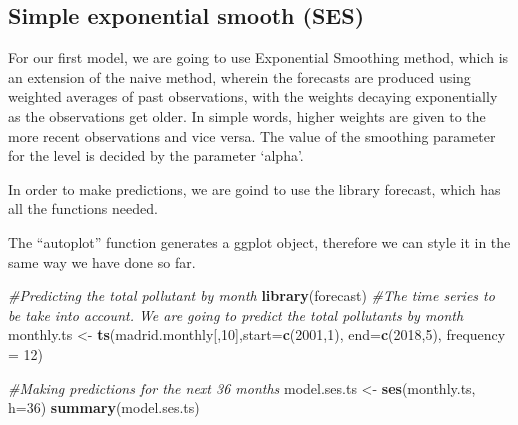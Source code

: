 \documentclass[
]{article}
\newenvironment{Shaded}{\begin{snugshade}}{\end{snugshade}}
\newcommand{\CommentTok}[1]{\textcolor[rgb]{0.56,0.35,0.01}{\textit{#1}}}
\newcommand{\DataTypeTok}[1]{\textcolor[rgb]{0.13,0.29,0.53}{#1}}
\newcommand{\DecValTok}[1]{\textcolor[rgb]{0.00,0.00,0.81}{#1}}
\newcommand{\KeywordTok}[1]{\textcolor[rgb]{0.13,0.29,0.53}{\textbf{#1}}}
\newcommand{\NormalTok}[1]{#1}
\newcommand{\StringTok}[1]{\textcolor[rgb]{0.31,0.60,0.02}{#1}}
\begin{document}
\hypertarget{simple-exponential-smooth-ses}{%
\subsection{Simple exponential smooth
(SES)}\label{simple-exponential-smooth-ses}}

For our first model, we are going to use Exponential Smoothing method,
which is an extension of the naive method, wherein the forecasts are
produced using weighted averages of past observations, with the weights
decaying exponentially as the observations get older. In simple words,
higher weights are given to the more recent observations and vice versa.
The value of the smoothing parameter for the level is decided by the
parameter `alpha'.

In order to make predictions, we are goind to use the library forecast,
which has all the functions needed.

The ``autoplot'' function generates a ggplot object, therefore we can
style it in the same way we have done so far.

\begin{Shaded}
\begin{Highlighting}[]
\CommentTok{#Predicting the total pollutant by month}
\KeywordTok{library}\NormalTok{(forecast)}
\CommentTok{#The time series to be take into account. We are going to predict the total pollutants by month}
\NormalTok{monthly.ts <-}\StringTok{ }\KeywordTok{ts}\NormalTok{(madrid.monthly[,}\DecValTok{10}\NormalTok{],}\DataTypeTok{start=}\KeywordTok{c}\NormalTok{(}\DecValTok{2001}\NormalTok{,}\DecValTok{1}\NormalTok{), }\DataTypeTok{end=}\KeywordTok{c}\NormalTok{(}\DecValTok{2018}\NormalTok{,}\DecValTok{5}\NormalTok{), }\DataTypeTok{frequency =} \DecValTok{12}\NormalTok{)}

\CommentTok{#Making predictions for the next 36 months}
\NormalTok{model.ses.ts <-}\StringTok{ }\KeywordTok{ses}\NormalTok{(monthly.ts, }\DataTypeTok{h=}\DecValTok{36}\NormalTok{)}
\KeywordTok{summary}\NormalTok{(model.ses.ts)}
\end{Highlighting}
\end{Shaded}
\end{document}
